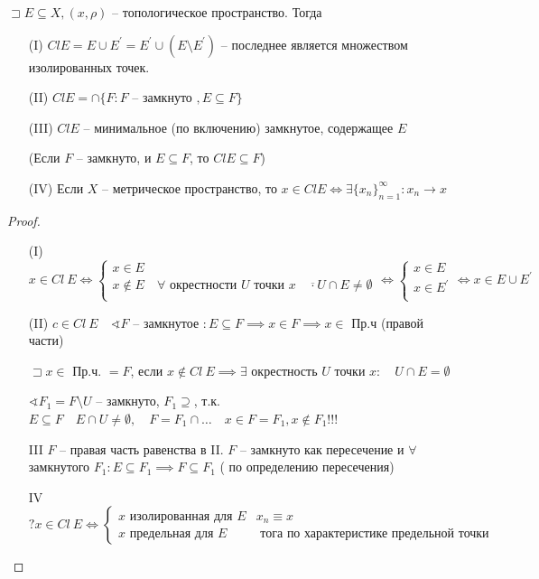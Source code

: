 \documentclass{book}
\renewcommand\O{\ensuremath{\emptyset}}
\newcommand{\p}[1]{#1^{\prime}}
\theoremstyle{definition}
\begin{document}
\begin{theorem}
    [О замыкании]

    $\sqsupset E \subseteq X, (x, \rho)$ -- топологическое пространство. Тогда
    \begin{enumerate}
        \item [(I)] $Cl E = E\cup \p E = \p E \cup (E\setminus \p E)$ -- последнее является множеством изолированных точек. 
        \item [(II)]  $Cl E = \cap \{F: F \text{ -- замкнуто }, E\subseteq F\} $
        \item [(III)] $Cl E$ -- минимальное (по включению) замкнутое, содержащее  $E$

            (Если $F$ -- замкнуто, и  $E\subseteq F$, то $Cl E\subseteq F$) 
        \item [(IV)] Если $X$ -- метрическое пространство, то  $x\in Cl E \iff \exists \{x_{n} \}_{n=1}^{\infty }: x_{n} \to x$
    \end{enumerate}
\end{theorem}
\begin{proof}
    \begin{enumerate}
        \item [(I)] $x\in Cl~E \iff \begin{cases}
            x\in E\\
            x\not\in E \quad \forall \text{ окрестности } U \text{ точки } x\quad \overline{\cdot}U\cap E \neq \O\\ 
        \end{cases} \iff  \begin{cases}
            x\in E\\
            x\in \p E\\
        \end{cases} \iff  x\in E\cup \p E$
    \item [(II)] $c\in Cl~E\quad \sphericalangle F$ -- замкнутое  $: E\subseteq F \implies  x\in F \implies x\in$ Пр.ч (правой части)

        $\sqsupset x\in$ Пр.ч. $=F$, если  $x\not\in Cl~E \implies  \exists $ окрестность $U$ точки $x:\quad U\cap E = \O $ 

         $\sphericalangle F_1 = F\setminus U$ -- замкнуто, $ F_1\supseteq$, т.к. $ E\subseteq F\quad E\cap U\neq \O , \quad F = F_1 \cap \ldots\quad x\in F = F_1, x\not\in F_1$!!!
     \item [III] $F$ -- правая часть равенства в II.  $F$ -- замкнуто как пересечение и  $\forall $ замкнутого $F_1: E\subseteq F_1 \implies F\subseteq F_1$ ( по определению пересечения)
     \item [IV] $?x\in Cl ~E \iff  \begin{cases}
             x \text{ изолированная для } E &x_{n} \equiv x\\
             x \text{ предельная для } E & \text{ тога по характеристике предельной точки}
     \end{cases}$
    \end{enumerate}
\end{proof}
\end{document}
